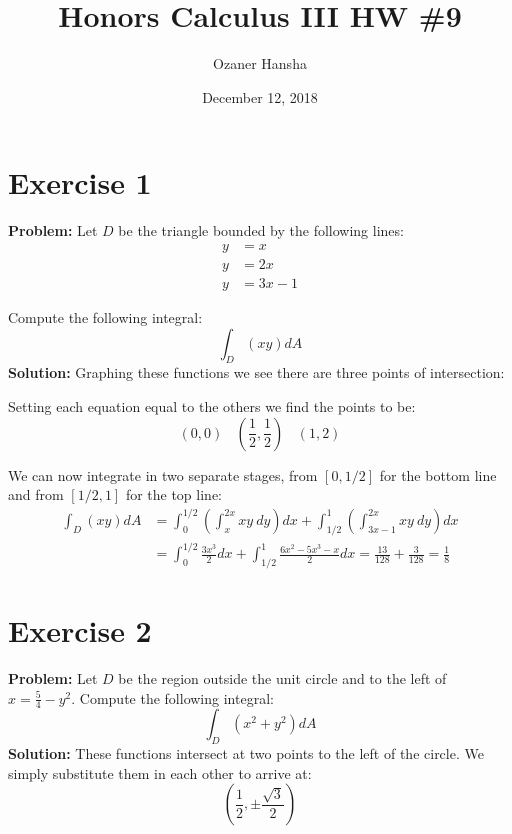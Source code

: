 \documentclass{article}
\begin{document}
\title{Honors Calculus III HW \#9}
\author{Ozaner Hansha}
\date{December 12, 2018}
\maketitle

\section*{Exercise 1}
\textbf{Problem:} Let $D$ be the triangle bounded by the following lines:
\begin{align*}
  y&=x\\
  y&=2x\\
  y&=3x-1
\end{align*}

Compute the following integral:
$$\int_D\left(xy\right)dA$$
\textbf{Solution:} Graphing these functions we see there are three points of intersection:
\begin{center}
\end{center}

Setting each equation equal to the others we find the points to be:
$$(0,0)\ \ \ \ \left(\frac{1}{2},\frac{1}{2}\right)\ \ \ \ (1,2)$$

We can now integrate in two separate stages, from $[0,1/2]$ for the bottom line and from $[1/2,1]$ for the top line:
\begin{align*}
  \int_D\left(xy\right)dA&=\int_0^{1/2}\left(\int_x^{2x}xy\ dy\right)dx+\int_{1/2}^1\left(\int_{3x-1}^{2x}xy\ dy\right)dx\\
  &=\int_0^{1/2}\frac{3x^3}{2}dx+\int_{1/2}^1\frac{6x^2-5x^3-x}{2}dx=\frac{13}{128}+\frac{3}{128}=\frac{1}{8}
\end{align*}

\section*{Exercise 2}
\textbf{Problem:} Let $D$ be the region outside the unit circle and to the left of $x=\frac{5}{4}-y^2$. Compute the following integral:
$$\int_D\left(x^2+y^2\right)dA$$
\textbf{Solution:} These functions intersect at two points to the left of the circle. We simply substitute them in each other to arrive at:
$$\left(\frac{1}{2},\pm\frac{\sqrt 3}{2}\right)$$
\end{document}
